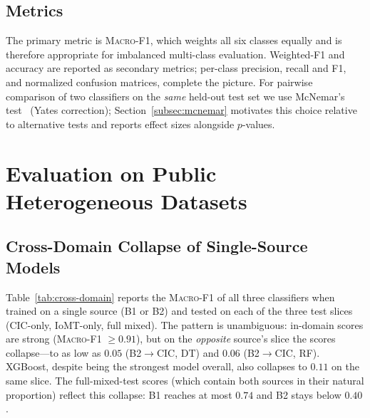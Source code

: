 \documentclass[runningheads]{llncs}
\newcommand{\macroF}{\textsc{Macro-F1}}
\begin{document}
\subsection{Metrics}

The primary metric is \macroF{}, which weights all six classes equally and is therefore appropriate for imbalanced multi-class evaluation. Weighted-F1 and accuracy are reported as secondary metrics; per-class precision, recall and F1, and normalized confusion matrices, complete the picture. For pairwise comparison of two classifiers on the \emph{same} held-out test set we use McNemar's test~\cite{mcnemar1947note} (Yates correction); Section~\ref{subsec:mcnemar} motivates this choice relative to alternative tests and reports effect sizes alongside $p$-values.

\section{Evaluation on Public Heterogeneous Datasets}
\label{sec:results_1}

\subsection{Cross-Domain Collapse of Single-Source Models}

Table~\ref{tab:cross-domain} reports the \macroF{} of all three classifiers when trained on a single source (B1 or B2) and tested on each of the three test slices (CIC-only, IoMT-only, full mixed). The pattern is unambiguous: in-domain scores are strong (\macroF{} $\geq 0.91$), but on the \emph{opposite} source's slice the scores collapse---to as low as $0.05$ (B2$\to$CIC, DT) and $0.06$ (B2$\to$CIC, RF). XGBoost, despite being the strongest model overall, also collapses to $0.11$ on the same slice. The full-mixed-test scores (which contain both sources in their natural proportion) reflect this collapse: B1 reaches at most $0.74$ and B2 stays below $0.40$.
\end{document}
